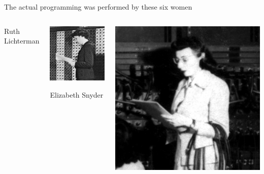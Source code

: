 \documentclass[aspectratio=169]{beamer}
\begin{document}
\begin{frame}{The actual programming was performed by these six women}
\begin{columns}[t]
\begin{center}
Ruth Lichterman
\end{center}

\begin{center}
\includegraphics[width=\linewidth]{Betty-Snyder.jpg}

Elizabeth Snyder
\end{center}

\begin{center}
\includegraphics[width=\linewidth]{Marlyn-Meltzer.jpg}


\end{center}
\end{columns}
\end{frame}
\end{document}
